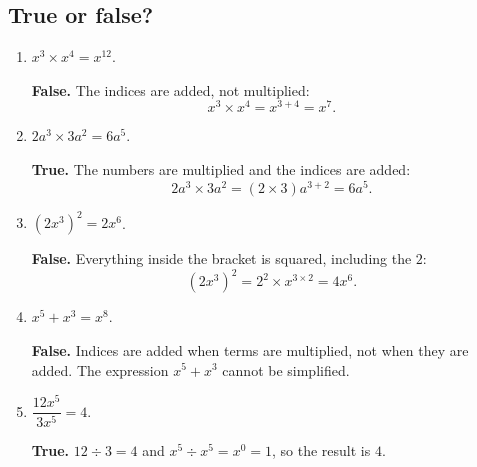 \documentclass[11pt]{article}
\begin{document}
\subsection*{True or false?}
\begin{enumerate}
\item $x^3\times x^4=x^{12}$.

\textbf{False.} The indices are added, not multiplied:
\[
x^3\times x^4=x^{3+4}=x^7.
\]

\item $2a^3\times3a^2=6a^5$.

\textbf{True.} The numbers are multiplied and the indices are added:
\[
2a^3\times3a^2=(2\times3)a^{3+2}=6a^5.
\]

\item $\left(2x^3\right)^2=2x^6$.

\textbf{False.} Everything inside the bracket is squared, including the $2$:
\[
\left(2x^3\right)^2=2^2\times x^{3\times2}=4x^6.
\]

\item $x^5+x^3=x^8$.

\textbf{False.} Indices are added when terms are multiplied, not when they are added. The expression $x^5+x^3$ cannot be simplified.

\item $\dfrac{12x^5}{3x^5}=4$.

\textbf{True.} $12\div3=4$ and $x^5\div x^5=x^0=1$, so the result is $4$.
\end{enumerate}
\end{document}
